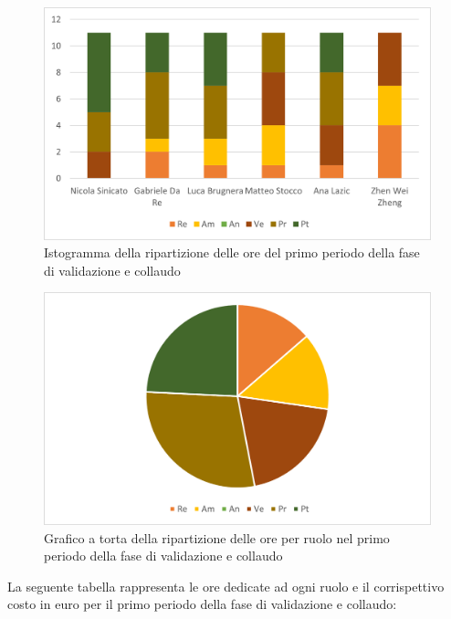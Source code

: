 \begin{figure}[H]
    \centering
    \includegraphics[scale=0.6]{img/grafi preventivo/istogrammi/validazione/periodo1.png}
    \caption{Istogramma della ripartizione delle ore del primo periodo della fase di validazione e collaudo}
\end{figure}
\begin{figure}[H]
    \centering
    \includegraphics[scale=0.6]{img/grafi preventivo/torta/validazione/periodo1.png}
    \caption{Grafico a torta della ripartizione delle ore per ruolo nel primo periodo della fase di validazione e collaudo}
\end{figure}
La seguente tabella rappresenta le ore dedicate ad ogni ruolo e il corrispettivo costo in euro per il primo periodo della fase di validazione e collaudo:

